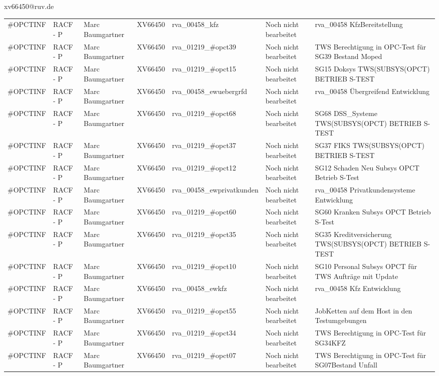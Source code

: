 \documentclass[a4paper,landscape,12pt]{letter}
\begin{document}
\begin{letter}{xv66450@ruv.de\hfill \break}
\begin{tiny}
\begin{longtable}{|p{35mm}|p{15mm}|p{25mm}|p{10mm}|p{40mm}|p{50mm}|p{50mm}|}
\#OPCTINF & RACF - P & Marc Baumgartner & XV66450 & rva\_00458\_kfz & Noch nicht bearbeitet & rva\_00458 KfzBereitstellung \\
\#OPCTINF & RACF - P & Marc Baumgartner & XV66450 & rva\_01219\_\#opct39 & Noch nicht bearbeitet & TWS Berechtigung in OPC-Test für SG39 Bestand Moped \\
\#OPCTINF & RACF - P & Marc Baumgartner & XV66450 & rva\_01219\_\#opct15 & Noch nicht bearbeitet & SG15 Doksys TWS(SUBSYS(OPCT) BETRIEB S-TEST \\
\#OPCTINF & RACF - P & Marc Baumgartner & XV66450 & rva\_00458\_ewuebergrfd & Noch nicht bearbeitet & rva\_00458 Übergreifend Entwicklung \\
\#OPCTINF & RACF - P & Marc Baumgartner & XV66450 & rva\_01219\_\#opct68 & Noch nicht bearbeitet & SG68 DSS\_Systeme TWS(SUBSYS(OPCT) BETRIEB S-TEST \\
\#OPCTINF & RACF - P & Marc Baumgartner & XV66450 & rva\_01219\_\#opct37 & Noch nicht bearbeitet & SG37 FIKS TWS(SUBSYS(OPCT) BETRIEB S-TEST \\
\#OPCTINF & RACF - P & Marc Baumgartner & XV66450 & rva\_01219\_\#opct12 & Noch nicht bearbeitet & SG12 Schaden Neu Subsys OPCT Betrieb S-Test \\
\#OPCTINF & RACF - P & Marc Baumgartner & XV66450 & rva\_00458\_ewprivatkunden & Noch nicht bearbeitet & rva\_00458 Privatkundensysteme Entwicklung \\
\#OPCTINF & RACF - P & Marc Baumgartner & XV66450 & rva\_01219\_\#opct60 & Noch nicht bearbeitet & SG60 Kranken Subsys OPCT Betrieb S-Test \\
\#OPCTINF & RACF - P & Marc Baumgartner & XV66450 & rva\_01219\_\#opct35 & Noch nicht bearbeitet & SG35 Kreditversicherung TWS(SUBSYS(OPCT) BETRIEB S-TEST \\
\#OPCTINF & RACF - P & Marc Baumgartner & XV66450 & rva\_01219\_\#opct10 & Noch nicht bearbeitet & SG10 Personal Subsys OPCT für TWS Aufträge mit Update \\
\#OPCTINF & RACF - P & Marc Baumgartner & XV66450 & rva\_00458\_ewkfz & Noch nicht bearbeitet & rva\_00458 Kfz Entwicklung \\
\#OPCTINF & RACF - P & Marc Baumgartner & XV66450 & rva\_01219\_\#opct55 & Noch nicht bearbeitet & JobKetten auf dem Host in den Testumgebungen \\
\#OPCTINF & RACF - P & Marc Baumgartner & XV66450 & rva\_01219\_\#opct34 & Noch nicht bearbeitet & TWS Berechtigung in OPC-Test für SG34KFZ \\
\#OPCTINF & RACF - P & Marc Baumgartner & XV66450 & rva\_01219\_\#opct07 & Noch nicht bearbeitet & TWS Berechtigung in OPC-Test für SG07Bestand Unfall \\

\end{longtable}
\end{tiny}
\end{letter}
\end{document}

